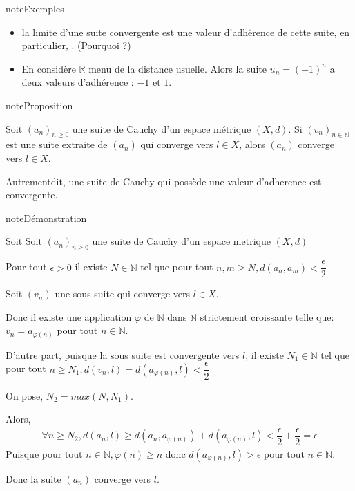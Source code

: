 \documentclass[letterpaper,10pt,french]{sphinxmanual}
\begin{document}
\begin{sphinxadmonition}{note}{Exemples}
\begin{itemize}
\item {} 
\sphinxAtStartPar
la limite d’une suite convergente est une valeur d’adhérence de cette suite, en particulier, . (Pourquoi ?)

\item {} 
\sphinxAtStartPar
En considère \(\mathbb R\) menu de la distance usuelle. Alors la suite \(u_n = (-1)^n\) a deux valeurs d’adhérence : \(-1\) et \(1\).

\end{itemize}
\end{sphinxadmonition}

\begin{sphinxadmonition}{note}{Proposition}

\sphinxAtStartPar
Soit \((a_n)_{n\geq 0}\) une suite  de Cauchy d’un espace métrique \((X, d)\). Si \((v_n)_{n\in \mathbb N}\) est une suite extraite de  \((a_n)\) qui converge vers \(l\in X\), alors \((a_n)\)  converge vers \(l\in X\).

\sphinxAtStartPar
Autrementdit, une suite de Cauchy qui possède une valeur d’adherence est convergente.
\end{sphinxadmonition}

\begin{sphinxadmonition}{note}{Démonstration}

\sphinxAtStartPar
Soit Soit \((a_n)_{n\geq 0}\) une suite  de Cauchy d’un espace metrique \((X, d)\)

\sphinxAtStartPar
Pour tout \(\epsilon >0\) il existe \(N \in \mathbb N\) tel que pour tout \(n, m \geq N, d(a_n, a_m)<\dfrac{\epsilon}{2}\)

\sphinxAtStartPar
Soit \((v_n)\) une sous suite qui converge vers \(l\in X\).

\sphinxAtStartPar
Donc il existe une application \(\varphi \) de \(\mathbb N\) dans \(\mathbb N\) strictement croissante telle que: \(v_n= a_{\varphi(n)}\) pour tout \(n \in \mathbb N\).

\sphinxAtStartPar
D’autre part, puisque la sous suite est convergente vers \(l\),  il existe \(N_1 \in \mathbb N\) tel que pour tout \(n \geq N_1, d(v_n,l)=d(a_{\varphi(n)},l) <\dfrac{\epsilon}{2}\)

\sphinxAtStartPar
On pose, \(N_2 = max(N, N_1)\).

\sphinxAtStartPar
Alors,
\begin{equation*}
\begin{split}
\forall n \geq N_2, d(a_n, l)\geq d(a_n, a_{\varphi(n)}) + d(a_{\varphi(n)},l )< \dfrac{\epsilon}{2} + \dfrac{\epsilon}{2} = \epsilon
\end{split}
\end{equation*}
\sphinxAtStartPar
Puisque pour tout \(n \in \mathbb N, \varphi(n)\geq n\) donc \(d(a_{\varphi(n)}, l)>\epsilon\) pour tout \(n \in \mathbb N\).

\sphinxAtStartPar
Donc la suite \((a_n)\) converge vers \(l\).
\end{sphinxadmonition}
\end{document}
